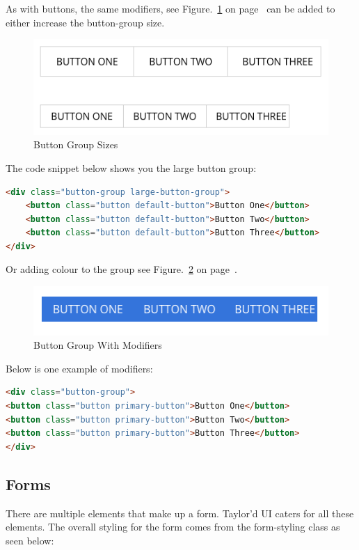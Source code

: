 As with buttons, the same modifiers, see Figure.~\ref{fig:groupSize} on  page~\pageref{fig:groupSize} can be added to either increase the button-group size. 

\begin{figure}[h]
\centering
\includegraphics[scale=0.3]{images/button-group-size}
\caption{Button Group Sizes}
  \label{fig:groupSize}
\end{figure}


The code snippet below shows you the large button group:

\begin{lstlisting}[language=HTML]
<div class="button-group large-button-group">
	<button class="button default-button">Button One</button>
	<button class="button default-button">Button Two</button>
	<button class="button default-button">Button Three</button>
</div>
\end{lstlisting}

Or adding colour to the group see Figure.~\ref{fig:modButtonGroup} on  page~\pageref{fig:modButtonGroup}. 

\begin{figure}[h]
\centering
\includegraphics[scale=0.3]{images/buttongroups}
\caption{Button Group With Modifiers}
  \label{fig:modButtonGroup}
\end{figure}

Below is one example of modifiers:  

\begin{lstlisting}[language=HTML]
<div class="button-group">
<button class="button primary-button">Button One</button>
<button class="button primary-button">Button Two</button>
<button class="button primary-button">Button Three</button>
</div>
\end{lstlisting}

\subsection*{Forms}
There are multiple elements that make up a form. Taylor'd UI caters for all these elements. The overall styling for the form comes from the form-styling class as seen below:

